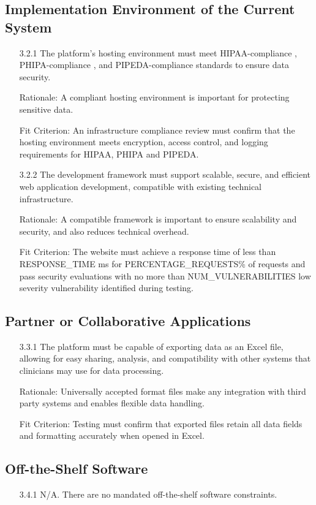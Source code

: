 \documentclass[12pt]{article}
\begin{document}
\subsection{Implementation Environment of the Current System}
\begin{itemize}
  \item[3.2.1] The platform’s hosting environment must meet HIPAA-compliance \cite{hipaa}, PHIPA-compliance \cite{phipa}, and PIPEDA-compliance \cite{pipeda} standards to ensure data security.
  \item[] Rationale: A compliant hosting environment is important for protecting sensitive data.
  \item[] Fit Criterion: An infrastructure compliance review must confirm that the hosting environment meets encryption, access control, and logging requirements for HIPAA, PHIPA and PIPEDA.
  \item[3.2.2] The development framework must support scalable, secure, and efficient web application development, compatible with existing technical 
  infrastructure.
  \item[] Rationale: A compatible framework is important to ensure scalability and security, and also reduces technical overhead.
  \item[] Fit Criterion: The website must achieve a response time of less than RESPONSE\_TIME ms for PERCENTAGE\_REQUESTS\% of requests and pass security evaluations with no more than NUM\_VULNERABILITIES low severity vulnerability identified during testing.
\end{itemize}
\subsection{Partner or Collaborative Applications}
\begin{itemize}
  \item[3.3.1] The platform must be capable of exporting data as an Excel file, allowing for easy sharing, analysis, and compatibility with other systems
  that clinicians may use for data processing.
  \item[] Rationale: Universally accepted format files make any integration with third party systems and enables flexible data handling.
  \item[] Fit Criterion: Testing must confirm that exported files retain all data fields and formatting accurately when opened in Excel.
\end{itemize}
\subsection{Off-the-Shelf Software}
\begin{itemize}
  \item[3.4.1] N/A. There are no mandated off-the-shelf software constraints. 
\end{itemize}
\end{document}
